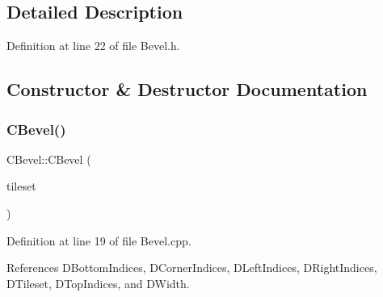 \subsection{Detailed Description}


Definition at line 22 of file Bevel.\+h.



\subsection{Constructor \& Destructor Documentation}
\hypertarget{classCBevel_ad274c6ae606a5d61b6240ee0c68081f7}{}\label{classCBevel_ad274c6ae606a5d61b6240ee0c68081f7} 
\subsubsection{\texorpdfstring{C\+Bevel()}{CBevel()}}
{\footnotesize\ttfamily C\+Bevel\+::\+C\+Bevel (\begin{DoxyParamCaption}\item[{std\+::shared\+\_\+ptr$<$ \hyperlink{classCGraphicTileset}{C\+Graphic\+Tileset} $>$}]{tileset }\end{DoxyParamCaption})}



Definition at line 19 of file Bevel.\+cpp.



References D\+Bottom\+Indices, D\+Corner\+Indices, D\+Left\+Indices, D\+Right\+Indices, D\+Tileset, D\+Top\+Indices, and D\+Width.


